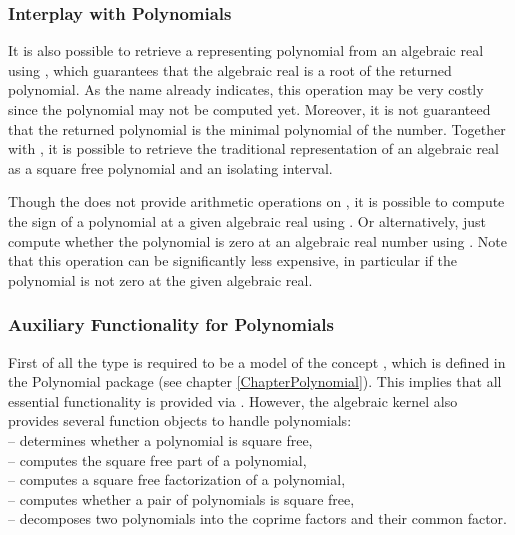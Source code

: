 

\subsubsection{Interplay with Polynomials}
It is also possible to retrieve a representing polynomial from an
algebraic real using , 
which guarantees that the algebraic real is a root of the returned
polynomial. As the name already indicates, this operation may be very
costly since the polynomial may not be computed yet. Moreover, it is
not guaranteed that the returned polynomial is the minimal polynomial
of the number.  Together with , it
is possible to retrieve the traditional representation of an algebraic
real as a square free polynomial and an isolating interval.

Though the  does not provide arithmetic
operations on , it is
possible to compute the sign of a polynomial at a given algebraic
real using .  Or alternatively,
just compute whether the polynomial is zero at an algebraic real number
using .  Note that this operation
can be significantly less expensive, in particular if the polynomial
is not zero at the given algebraic real.


\subsubsection{Auxiliary Functionality for Polynomials}

First of all the type  is required
to be a model of the concept , which is defined
in the Polynomial package (see chapter \ref{ChapterPolynomial}).
This implies that all essential functionality is provided via
. However, the algebraic kernel also
provides several function objects to handle polynomials:\\
 -- determines whether a polynomial is square free,\\
 -- computes the square free part of a polynomial,\\
 -- computes a square free factorization of a polynomial,\\
 -- computes whether a pair of polynomials is square free,\\
 -- decomposes two polynomials into the coprime factors and their common factor. 

